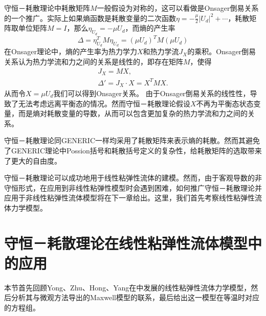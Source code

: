 	守恒－耗散理论中耗散矩阵$M$一般假设为对称的，这可以看做是Onsager倒易关系的一个推广。实际上如果熵函数是耗散变量的二次函数$\eta = -\frac{\mu}{2} |U_d|^2 + \cdots$，耗散矩阵取单位矩阵$M=I$，那么$\eta_{U_d} = - \mu U_d$，而熵的产生率
	\begin{equation*}
		\Delta = \eta_{U_d}^T M \eta_{U_d} = (\mu U_d)^T M (\mu U_d)%
	\end{equation*}
	在Onsager理论中，熵的产生率为热力学力$X$和热力学流$J_X$的乘积。Onsager倒易关系认为热力学流和力之间的关系是线性的，即存在矩阵$M$，使得
	\begin{eqnarray*}
		J_X = M X ,\\
		\Delta'= J_X \cdot X = X^T M X.
	\end{eqnarray*}
	从而令$X=\mu U_d$我们可以得到Onsager关系。
	由于Onsager倒易关系的线性性，导致了无法考虑远离平衡态的情况。然而守恒－耗散理论假设$X$不再为平衡态状态变量，而是熵对耗散变量的导数，从而可以包含更加复杂的热力学流和力之间的关系。

	守恒－耗散理论同GENERIC一样均采用了耗散矩阵来表示熵的耗散。然而其避免了GENERIC理论中Possion括号和耗散括号定义的复杂性，给耗散矩阵的选取带来了更大的自由度。%

	守恒－耗散理论可以成功地用于线性粘弹性流体的建模。然而，由于客观导数的非守恒形式，在应用到非线性粘弹性模型时会遇到困难，如何推广守恒－耗散理论并应用于非线性粘弹性流体模型将在下一章给出。这里，我们首先考察线性粘弹性流体力学模型。

	\section{守恒－耗散理论在线性粘弹性流体模型中的应用}
	本节首先回顾Yong、Zhu、Hong、Yang在\cite{zhu2014conservation}中发展的线性粘弹性流体力学模型，然后分析其与微观方法导出的Maxwell模型的联系，最后给出这一模型在等温时对应的方程组。
